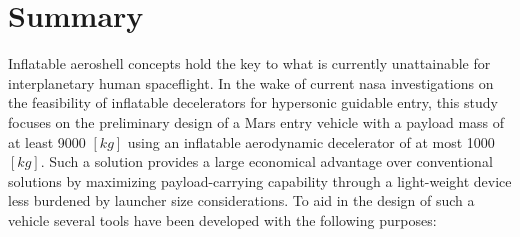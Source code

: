 \section*{Summary}\label{cha:summary}
Inflatable aeroshell concepts hold the key to what is currently unattainable for interplanetary human spaceflight. In the wake of current \acrshort{nasa} investigations on the feasibility of inflatable decelerators for hypersonic guidable entry, this study focuses on the preliminary design of a Mars entry vehicle with a payload mass of at least 9000 $\left[kg\right]$ using an inflatable aerodynamic decelerator of at most 1000 $\left[kg\right]$. Such a solution provides a large economical advantage over conventional solutions by maximizing payload-carrying capability through a light-weight device less burdened by launcher size considerations.
\newline
\newline
To aid in the design of such a vehicle several tools have been developed with the following purposes:

